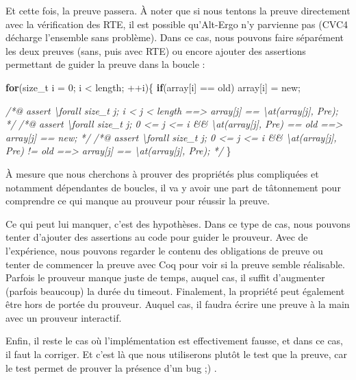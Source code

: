 \documentclass[12pt,francais,]{scrbook}
\newenvironment{Shaded}{}{}
\newcommand{\KeywordTok}[1]{\textcolor[rgb]{0.00,0.44,0.13}{\textbf{{#1}}}}
\newcommand{\DecValTok}[1]{\textcolor[rgb]{0.25,0.63,0.44}{{#1}}}
\newcommand{\CommentTok}[1]{\textcolor[rgb]{0.38,0.63,0.69}{\textit{{#1}}}}
\newcommand{\NormalTok}[1]{{#1}}
\begin{document}
Et cette fois, la preuve passera. À noter que si nous tentons la preuve
directement avec la vérification des RTE, il est possible qu'Alt-Ergo
n'y parvienne pas (CVC4 décharge l'ensemble sans problème). Dans ce cas,
nous pouvons faire séparément les deux preuves (sans, puis avec RTE) ou
encore ajouter des assertions permettant de guider la preuve dans la
boucle :

\begin{footnotesize}\begin{Shaded}
\begin{Highlighting}[]
\KeywordTok{for}\NormalTok{(size_t i = }\DecValTok{0}\NormalTok{; i < length; ++i)\{}
  \KeywordTok{if}\NormalTok{(array[i] == old) array[i] = new;}

  \CommentTok{/*@ assert \textbackslash{}forall size_t j; i < j < length }
\CommentTok{               ==> array[j] == \textbackslash{}at(array[j], Pre);                      */}
  \CommentTok{/*@ assert \textbackslash{}forall size_t j; 0 <= j <= i && \textbackslash{}at(array[j], Pre) == old }
\CommentTok{               ==> array[j] == new;                                     */}
  \CommentTok{/*@ assert \textbackslash{}forall size_t j; 0 <= j <= i && \textbackslash{}at(array[j], Pre) != old }
\CommentTok{               ==> array[j] == \textbackslash{}at(array[j], Pre);                      */}    
\NormalTok{\}}
\end{Highlighting}
\end{Shaded}\end{footnotesize}

À mesure que nous cherchons à prouver des propriétés plus compliquées et
notamment dépendantes de boucles, il va y avoir une part de tâtonnement
pour comprendre ce qui manque au prouveur pour réussir la preuve.

Ce qui peut lui manquer, c'est des hypothèses. Dans ce type de cas, nous
pouvons tenter d'ajouter des assertions au code pour guider le prouveur.
Avec de l'expérience, nous pouvons regarder le contenu des obligations
de preuve ou tenter de commencer la preuve avec Coq pour voir si la
preuve semble réalisable. Parfois le prouveur manque juste de temps,
auquel cas, il suffit d'augmenter (parfois beaucoup) la durée du
timeout. Finalement, la propriété peut également être hors de portée du
prouveur. Auquel cas, il faudra écrire une preuve à la main avec un
prouveur interactif.

Enfin, il reste le cas où l'implémentation est effectivement fausse, et
dans ce cas, il faut la corriger. Et c'est là que nous utiliserons
plutôt le test que la preuve, car le test permet de prouver la présence
d'un bug ;) .
\end{document}
